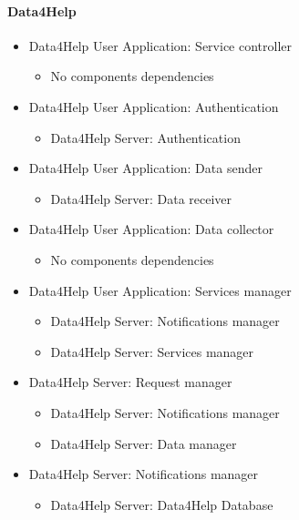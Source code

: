 \documentclass[../DD.tex]{subfiles}
\begin{document}
		\paragraph{Data4Help}
		\begin{itemize}

			\item{Data4Help User Application: Service controller}
			\begin{itemize}\item{No components dependencies}\end{itemize}

			\item{Data4Help User Application: Authentication}
			\begin{itemize}\item{Data4Help Server: Authentication}\end{itemize}

			\item{Data4Help User Application: Data sender}
			\begin{itemize}\item{Data4Help Server: Data receiver}\end{itemize}

			\item{Data4Help User Application: Data collector}
			\begin{itemize}\item{No components dependencies}\end{itemize}

			\item{Data4Help User Application: Services manager}
			\begin{itemize}\item{Data4Help Server: Notifications manager}\item{Data4Help Server: Services manager}\end{itemize}

			\item{Data4Help Server: Request manager}
			\begin{itemize}\item{Data4Help Server: Notifications manager}\item{Data4Help Server: Data manager}\end{itemize}

			\item{Data4Help Server: Notifications manager}
			\begin{itemize}\item{Data4Help Server: Data4Help Database}\end{itemize}


\end{itemize}
\end{document}
